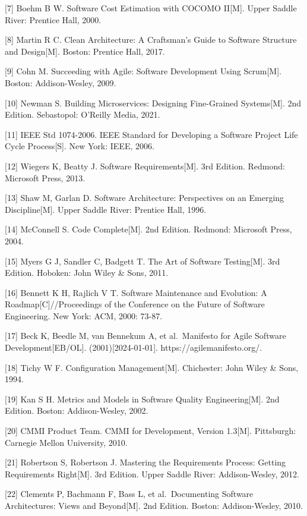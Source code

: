 \documentclass[12pt,a4paper]{article}
\begin{document}
{[}7{]} Boehm B W. Software Cost Estimation with COCOMO II{[}M{]}. Upper
Saddle River: Prentice Hall, 2000.

{[}8{]} Martin R C. Clean Architecture: A Craftsman's Guide to Software
Structure and Design{[}M{]}. Boston: Prentice Hall, 2017.

{[}9{]} Cohn M. Succeeding with Agile: Software Development Using
Scrum{[}M{]}. Boston: Addison-Wesley, 2009.

{[}10{]} Newman S. Building Microservices: Designing Fine-Grained
Systems{[}M{]}. 2nd Edition. Sebastopol: O'Reilly Media, 2021.

{[}11{]} IEEE Std 1074-2006. IEEE Standard for Developing a Software
Project Life Cycle Process{[}S{]}. New York: IEEE, 2006.

{[}12{]} Wiegers K, Beatty J. Software Requirements{[}M{]}. 3rd Edition.
Redmond: Microsoft Press, 2013.

{[}13{]} Shaw M, Garlan D. Software Architecture: Perspectives on an
Emerging Discipline{[}M{]}. Upper Saddle River: Prentice Hall, 1996.

{[}14{]} McConnell S. Code Complete{[}M{]}. 2nd Edition. Redmond:
Microsoft Press, 2004.

{[}15{]} Myers G J, Sandler C, Badgett T. The Art of Software
Testing{[}M{]}. 3rd Edition. Hoboken: John Wiley \& Sons, 2011.

{[}16{]} Bennett K H, Rajlich V T. Software Maintenance and Evolution: A
Roadmap{[}C{]}//Proceedings of the Conference on the Future of Software
Engineering. New York: ACM, 2000: 73-87.

{[}17{]} Beck K, Beedle M, van Bennekum A, et al.~Manifesto for Agile
Software Development{[}EB/OL{]}. (2001){[}2024-01-01{]}.
https://agilemanifesto.org/.

{[}18{]} Tichy W F. Configuration Management{[}M{]}. Chichester: John
Wiley \& Sons, 1994.

{[}19{]} Kan S H. Metrics and Models in Software Quality
Engineering{[}M{]}. 2nd Edition. Boston: Addison-Wesley, 2002.

{[}20{]} CMMI Product Team. CMMI for Development, Version 1.3{[}M{]}.
Pittsburgh: Carnegie Mellon University, 2010.

{[}21{]} Robertson S, Robertson J. Mastering the Requirements Process:
Getting Requirements Right{[}M{]}. 3rd Edition. Upper Saddle River:
Addison-Wesley, 2012.

{[}22{]} Clements P, Bachmann F, Bass L, et al.~Documenting Software
Architectures: Views and Beyond{[}M{]}. 2nd Edition. Boston:
Addison-Wesley, 2010.
\end{document}
